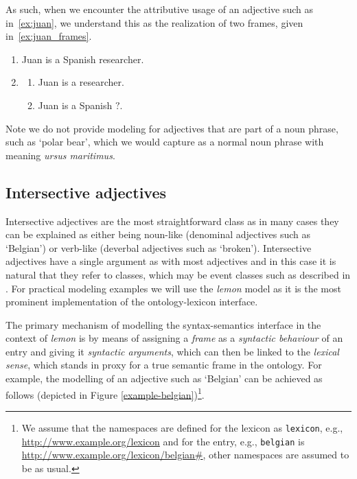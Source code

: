 \documentclass[11pt]{article}
\begin{document}
As such, when we encounter the attributive usage of an adjective such as in~\ref{ex:juan}, 
we understand this as the realization of two frames, given in~\ref{ex:juan_frames}.

\begin{enumerate}[resume]
\item Juan is a Spanish researcher. \label{ex:juan}
\item \begin{enumerate}
\item Juan is a researcher.
\item Juan is a Spanish $?$.
\end{enumerate}
\label{ex:juan_frames}
\end{enumerate}

Note we do not provide modeling for adjectives that are part of a noun phrase,
such as `polar bear', which we would capture as a normal noun phrase with 
meaning \emph{ursus maritimus}.

\subsection{Intersective adjectives}

Intersective adjectives are the most straightforward class as in many cases they 
can be explained as either being noun-like (denominal adjectives such as 
`Belgian') or verb-like (deverbal adjectives such as `broken'). Intersective 
adjectives have a single argument as with most adjectives and in this case it is 
natural that they refer to classes, which may be event classes such as described 
in \cite{mccrae2014design}. For practical modeling examples we will use the
\emph{lemon} model as it is the most prominent implementation of the 
ontology-lexicon interface.

The primary mechanism of modelling the syntax-semantics interface in the context 
of \emph{lemon} is by means of assigning a \emph{frame} as a \emph{syntactic 
behaviour} of an entry and giving it \emph{syntactic arguments}, which can then 
be linked to the \emph{lexical sense}, which stands in proxy for a true semantic 
frame in the ontology. For example, the modelling of an adjective such as 
`Belgian' can be achieved as follows (depicted in Figure 
\ref{example-belgian})\footnote{We assume that the namespaces are defined for 
the lexicon as {\tt lexicon}, e.g., \url{http://www.example.org/lexicon}
and for the entry, e.g., {\tt belgian} is \url{http://www.example.org/lexicon/belgian#},
other namespaces are assumed to be as usual.}.
\end{document}
